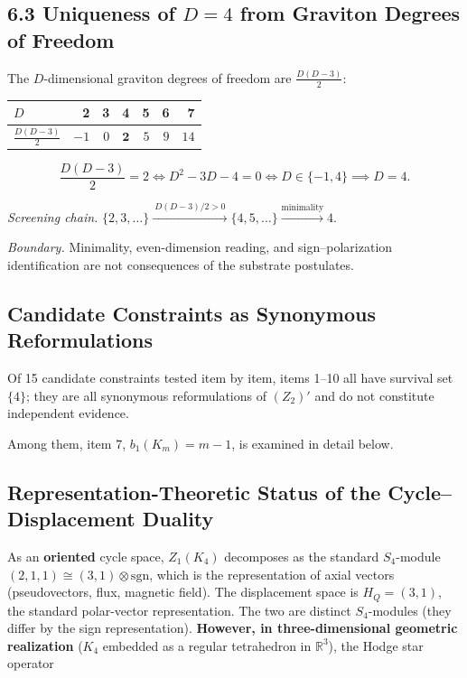 \documentclass[
  11pt,
]{article}
\newcounter{none} %
\begin{document}
\subsection{\texorpdfstring{6.3 Uniqueness of \(D=4\) from Graviton
Degrees of
Freedom}{6.3 Uniqueness of D=4 from Graviton Degrees of Freedom}}\label{uniqueness-of-d4-from-graviton-degrees-of-freedom}

The \(D\)-dimensional graviton degrees of freedom are
\(\frac{D(D-3)}2\):

{\def\LTcaptype{none} %
\begin{longtable}[]{@{}lrrrrrr@{}}
\toprule\noalign{}
\(D\) & 2 & 3 & 4 & 5 & 6 & 7 \\
\midrule\noalign{}
\endhead
\bottomrule\noalign{}
\endlastfoot
\(\frac{D(D-3)}2\) & \(-1\) & \(0\) & \(\mathbf2\) & \(5\) & \(9\) &
\(14\) \\
\end{longtable}
}

\[
\frac{D(D-3)}2=2 \iff D^2-3D-4=0 \iff D\in\{-1,4\} \implies D=4.
\tag{6.2}
\]

\emph{Screening chain.}
\(\{2,3,\dots\}\xrightarrow{\ D(D-3)/2>0\ }\{4,5,\dots\}\xrightarrow{\text{minimality}}4\).

\emph{Boundary.} Minimality, even-dimension reading, and
sign--polarization identification are not consequences of the substrate
postulates.

\subsection{Candidate Constraints as Synonymous
Reformulations}\label{candidate-constraints-as-synonymous-reformulations}

Of 15 candidate constraints tested item by item, items 1--10 all have
survival set \(\{4\}\); they are all synonymous reformulations of
\((Z_2)'\) and do not constitute independent evidence.

Among them, item 7, \(b_1(K_m)=m-1\), is examined in detail below.

\subsection{Representation-Theoretic Status of the
Cycle--Displacement
Duality}\label{representation-theoretic-status-of-the-cycledisplacement-duality}

As an \textbf{oriented} cycle space, \(Z_1(K_4)\) decomposes as the
standard \(S_4\)-module \((2,1,1)\cong(3,1)\otimes\mathrm{sgn}\), which
is the representation of axial vectors (pseudovectors, flux, magnetic
field). The displacement space is \(H_Q=(3,1)\), the standard
polar-vector representation. The two are distinct \(S_4\)-modules (they
differ by the sign representation). \textbf{However, in
three-dimensional geometric realization} (\(K_4\) embedded as a regular
tetrahedron in \(\mathbb R^3\)), the Hodge star operator
\end{document}
